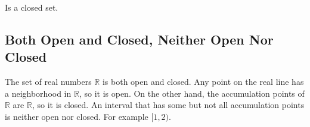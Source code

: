 Is a closed set.

\subsection{Both Open and Closed, Neither Open Nor Closed}
The set of real numbers $\mathbb{R}$ is both open and closed. Any point on the real line has a neighborhood in $\mathbb{R}$, so it is open. On the other hand, the accumulation points of $\mathbb{R}$ are $\mathbb{R}$, so it is closed. An interval that has some but not all accumulation points is neither open nor closed. For example $[1,2)$.	



